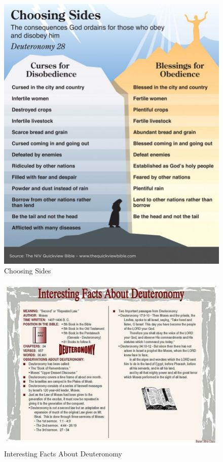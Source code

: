 \newpage
\begin{figure}
\begin{center}
\includegraphics[scale=0.5, angle=0]{05OT-Deuteronomy/References/ChoosingSides.jpeg}
\caption[Choosing Sides]{Choosing Sides}
\label{fig:Choosing Sides}
\end{center}
\end{figure}

\newpage
\begin{figure}
\begin{center}
\includegraphics[scale=0.8, angle=90]{05OT-Deuteronomy/References/interestingfactsaboutdeuteronomy.jpeg}
\caption[Interesting Facts About Deuteronomy]{Interesting Facts About Deuteronomy}
\label{fig:Interesting Facts About Deuteronomy}
\end{center}
\end{figure}


